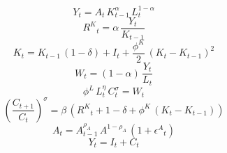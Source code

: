 \noindent[name= `Función de producción']
\begin{dmath}
{Y}_{t}={A}_{t}\, {K}_{t-1}^{{\alpha}}\, {L}_{t}^{1-{\alpha}}
\end{dmath}
\noindent[name= `Demanda de capital']
\begin{dmath}
{R^{K}}_{t}={\alpha}\, \frac{{Y}_{t}}{{K}_{t-1}}
\end{dmath}
\noindent[name= `Ley de acumulación de capital']
\begin{dmath}
{K}_{t}={K}_{t-1}\, \left(1-{\delta}\right)+{I}_{t}+\frac{{\phi^{K}}}{2}\, \left({K}_{t}-{K}_{t-1}\right)^{2}
\end{dmath}
\noindent[name= `Demanda de trabajo']
\begin{dmath}
{W}_{t}=\left(1-{\alpha}\right)\, \frac{{Y}_{t}}{{L}_{t}}
\end{dmath}
\noindent[name= `Oferta de trabajo']
\begin{dmath}
{\phi^{L}}\, {L}_{t}^{{\eta}}\, {C}_{t}^{{\sigma}}={W}_{t}
\end{dmath}
\noindent[name= `Ecuación de Euler']
\begin{dmath}
\left(\frac{{C}_{t+1}}{{C}_{t}}\right)^{{\sigma}}={\beta}\, \left({R^{K}}_{t}+1-{\delta}+{\phi^{K}}\, \left({K}_{t}-{K}_{t-1}\right)\right)
\end{dmath}
\noindent[name= `Productividad']
\begin{dmath}
{A}_{t}={A}_{t-1}^{{\rho_{A}}}\, {A}^{1-{\rho_{A}}}\, \left(1+{\epsilon^{A}}_{t}\right)
\end{dmath}
\noindent[name= `Demanda agregada']
\begin{dmath}
{Y}_{t}={I}_{t}+{C}_{t}
\end{dmath}
